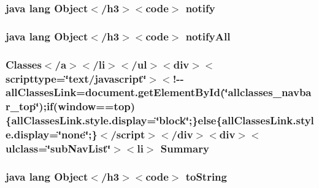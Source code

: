 \hypertarget{_r_8styleable_8html_ae99ae10b5010594dbda4794e02db271b}{
\subsubsection[{notify}]{\setlength{\rightskip}{0pt plus 5cm}java lang Object$<$/h3$>$$<$code$>$ notify}}\label{_r_8styleable_8html_ae99ae10b5010594dbda4794e02db271b}
\hypertarget{_r_8styleable_8html_a1279357e6e09e33e75b55eb05fdb6436}{
\subsubsection[{notify\-All}]{\setlength{\rightskip}{0pt plus 5cm}java lang Object$<$/h3$>$$<$code$>$ notify\-All}}\label{_r_8styleable_8html_a1279357e6e09e33e75b55eb05fdb6436}
\hypertarget{_r_8styleable_8html_ac7ec81c51b614583af8456708f867848}{
\subsubsection[{Summary}]{\setlength{\rightskip}{0pt plus 5cm}Classes$<$/{\bf a}$>$$<$/li$>$$<$/ul$>$$<$div$>$$<$scripttype=\char`\"{}text/javascript\char`\"{}$>$$<$!-\/-\/all\-Classes\-Link=document.\-get\-Element\-By\-Id(\char`\"{}allclasses\-\_\-navbar\-\_\-top\char`\"{});if(window==top)\{all\-Classes\-Link.\-style.\-display=\char`\"{}block\char`\"{};\}else\{all\-Classes\-Link.\-style.\-display=\char`\"{}none\char`\"{};\}$<$/script$>$$<$/div$>$$<$div$>$$<$ulclass=\char`\"{}sub\-Nav\-List\char`\"{}$>$$<$li$>$ Summary}}\label{_r_8styleable_8html_ac7ec81c51b614583af8456708f867848}
\hypertarget{_r_8styleable_8html_a36e8a76a4132c9a7081416f27d087615}{
\subsubsection[{to\-String}]{\setlength{\rightskip}{0pt plus 5cm}java lang Object$<$/h3$>$$<$code$>$ to\-String}}\label{_r_8styleable_8html_a36e8a76a4132c9a7081416f27d087615}
